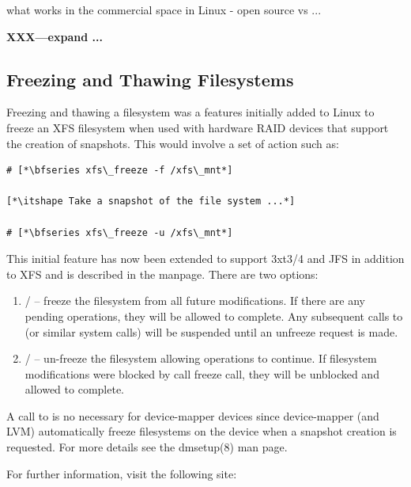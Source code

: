 what works in the commercial space in Linux - open source vs ...

{\bfseries XXX---expand ...}

\subsection{Freezing and Thawing Filesystems}


Freezing and thawing a filesystem was a features initially added to Linux to freeze an XFS filesystem when used with hardware RAID devices that support the creation of snapshots. This would involve a set of action such as:

\begin{lstlisting}
# [*\bfseries xfs\_freeze -f /xfs\_mnt*]

[*\itshape Take a snapshot of the file system ...*]

# [*\bfseries xfs\_freeze -u /xfs\_mnt*]
\end{lstlisting}

\noindent
This initial feature has now been extended to support 3xt3/4 and JFS in addition to XFS and is described in the  manpage. There are two options:

\begin{enumerate}
	\item {} /  -- freeze the filesystem from all future modifications. If there are any pending operations, they will be
		allowed to complete. Any subsequent calls to  (or similar system calls) will be suspended until an unfreeze
		request is made.
	\item {} /  -- un-freeze the filesystem allowing operations to continue. If filesystem modifications  
		were blocked by call freeze call, they will be unblocked and allowed to complete.
\end{enumerate}

\noindent
A call to  is no necessary for device-mapper devices since device-mapper (and LVM) automatically freeze filesystems on the device when a snapshot creation is requested. For more details see the dmsetup(8) man page.

For further information, visit the following site:

